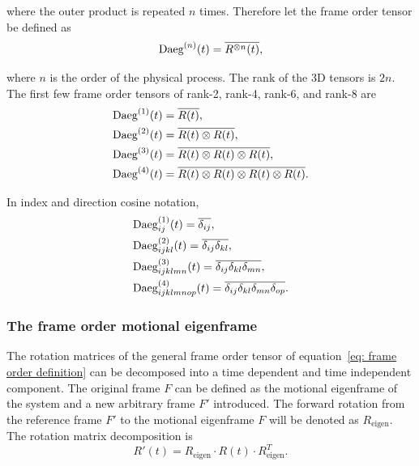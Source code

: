 where the outer product is repeated $n$ times.
Therefore let the frame order tensor be defined as
\begin{equation} \label{eq: frame order definition}
    \textrm{Daeg}^{(n)}(t) = \overline{R^{\otimes n}(t)} ,
\end{equation}

where $n$ is the order of the physical process.
The rank of the 3D tensors is $2n$.
The first few frame order tensors of rank-2, rank-4, rank-6, and rank-8 are
\begin{subequations}
\begin{align}
    \textrm{Daeg}^{(1)}(t) &= \overline{R(t)} , \\
    \textrm{Daeg}^{(2)}(t) &= \overline{R(t) \otimes R(t)} , \\
    \textrm{Daeg}^{(3)}(t) &= \overline{R(t) \otimes R(t) \otimes R(t)} , \\
    \textrm{Daeg}^{(4)}(t) &= \overline{R(t) \otimes R(t) \otimes R(t) \otimes R(t)} .
\end{align}
\end{subequations}

In index and direction cosine notation,
\begin{subequations}
\begin{align}
    &\textrm{Daeg}^{(1)}_{ij}(t) = \overline{\delta_{ij}} , \\
    &\textrm{Daeg}^{(2)}_{ijkl}(t) = \overline{\delta_{ij}\delta_{kl}} , \\
    &\textrm{Daeg}^{(3)}_{ijklmn}(t) = \overline{\delta_{ij}\delta_{kl}\delta_{mn}} , \\
    &\textrm{Daeg}^{(4)}_{ijklmnop}(t) = \overline{\delta_{ij}\delta_{kl}\delta_{mn}\delta_{op}} .
\end{align}
\end{subequations}





\subsubsection{The frame order motional eigenframe}

The rotation matrices of the general frame order tensor of equation~\ref{eq: frame order definition} can be decomposed into a time dependent and time independent component.
The original frame $F$ can be defined as the motional eigenframe of the system and a new arbitrary frame $F'$ introduced.
The forward rotation from the reference frame $F'$ to the motional eigenframe $F$ will be denoted as $R_{\textrm{eigen}}$.
The rotation matrix decomposition is
\begin{equation}
    R'(t) = R_{\textrm{eigen}} \cdot R(t) \cdot R_{\textrm{eigen}}^T .
\end{equation}

